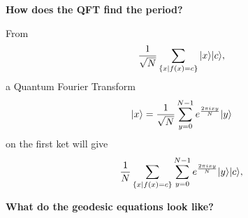 \documentclass{slides}
\begin{document}
\pagebreak



\begin{center}
\textbf{How does the QFT find the period?}
\end{center}

From 
\begin{equation*}
\frac{1}{\sqrt{N}}\sum_{\lbrace x|f(x)=c\rbrace} {|{x}\rangle}{|{c}\rangle},
\end{equation*}
a Quantum Fourier Transform 
\begin{equation*}
{|{x}\rangle} = \frac{1}{\sqrt{N}}\sum_{y=0}^{N-1} e^{\frac{2\pi ixy}{N}}{|{y}\rangle}
\end{equation*}
on the first ket will give
\begin{equation*}
\frac{1}{N}\sum_{\lbrace x|f(x)=c\rbrace}\sum_{y=0}^{N-1} 
e^{\frac{2\pi ixy}{N}}{|{y}\rangle}{|{c}\rangle},
\end{equation*}

\pagebreak


\begin{center}
\textbf{What do the geodesic equations look like?}
\end{center}
\end{document}
